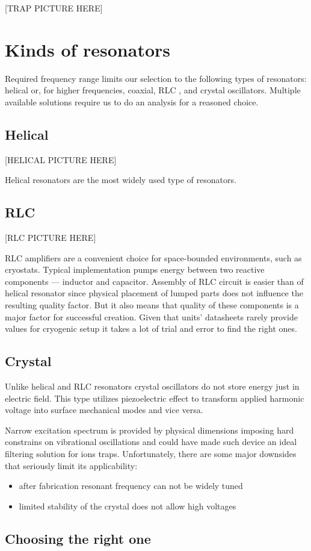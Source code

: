 [TRAP PICTURE HERE]

\section{Kinds of resonators}
\label{sec:kinds_resonators}
Required frequency range limits our selection to the following types of resonators: helical \cite{Gulde2017} or, for higher frequencies, coaxial, RLC \cite{Gandolfi2010}, and crystal oscillators. Multiple available solutions require us to do an analysis for a reasoned choice.
\subsection{Helical}
[HELICAL PICTURE HERE]

Helical resonators are the most widely used type of resonators.
\subsection{RLC}
[RLC PICTURE HERE]

RLC amplifiers are a convenient choice for space-bounded environments, such as cryostats. Typical implementation pumps energy between two reactive components --- inductor and capacitor. Assembly of RLC circuit is easier than of helical resonator since physical placement of lumped parts does not influence the resulting quality factor. But it also means that quality of these components is a major factor for successful creation. Given that units' datasheets rarely provide values for cryogenic setup it takes a lot of trial and error to find the right ones.
\subsection{Crystal}
Unlike helical and RLC resonators crystal oscillators do not store energy just in electric field. This type utilizes piezoelectric effect to transform applied harmonic voltage into surface mechanical modes and vice versa.

Narrow excitation spectrum is provided by physical dimensions imposing hard constrains on vibrational oscillations and could have made such device an ideal filtering solution for ions traps. Unfortunately, there are some major downsides that seriously limit its applicability:
\begin{itemize}
	\item after fabrication resonant frequency can not be widely tuned
	\item limited stability of the crystal does not allow high voltages
\end{itemize}
\subsection{Choosing the right one}